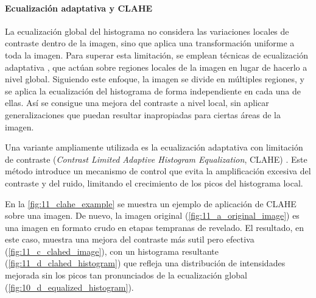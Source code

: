 \paragraph{Ecualización adaptativa y CLAHE} \label{subsubsubsec:3_5_3_3_ecualizacion_adaptativa_clahe}
La ecualización global del histograma no considera las variaciones locales de contraste dentro de la imagen, 
sino que aplica una transformación uniforme a toda la imagen. Para superar esta limitación, se emplean 
técnicas de ecualización adaptativa \cite{adaptative_histogram_equalization}, que actúan sobre regiones 
locales de la imagen en lugar de hacerlo a nivel global. Siguiendo este enfoque, la imagen se divide en 
múltiples regiones, y se aplica la ecualización del histograma de forma independiente en cada una de ellas.
Así se consigue una mejora del contraste a nivel local, sin aplicar generalizaciones que 
puedan resultar inapropiadas para ciertas áreas de la imagen.

Una variante ampliamente utilizada es la ecualización adaptativa con limitación de contraste
(\textit{Contrast Limited Adaptive Histogram Equalization}, CLAHE) \cite{clahe}. Este método introduce un
mecanismo de control que evita la amplificación excesiva del contraste y del ruido, limitando el
crecimiento de los picos del histograma local.

En la \autoref{fig:11_clahe_example} se muestra un ejemplo de aplicación de CLAHE sobre una imagen.
De nuevo, la imagen original (\autoref{fig:11_a_original_image}) es una imagen en formato crudo en etapas
tempranas de revelado. El resultado, en este caso, muestra una mejora del contraste más sutil pero efectiva
(\autoref{fig:11_c_clahed_image}), con un histograma resultante (\autoref{fig:11_d_clahed_histogram})
que refleja una distribución de intensidades mejorada sin los picos tan pronunciados de la ecualización 
global (\autoref{fig:10_d_equalized_histogram}).

